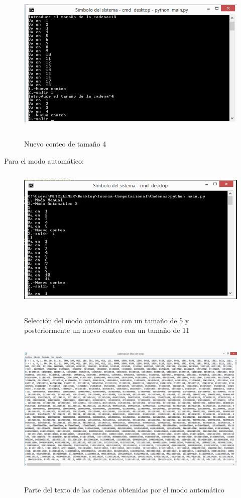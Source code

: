 \documentclass[12pt,letterpaper]{article}
\begin{document}
\begin{figure}[H]
\includegraphics[width=\textwidth, height=7cm]{nuevoconteo.png}
\label{fig:manualnuevoconteo_alfabeto}
\caption{Nuevo conteo de tama\~no 4}
\end{figure}

Para el modo autom\'atico:\\
\begin{figure}[H]
\includegraphics[width=\textwidth, height=7cm]{modoautomatico.png}
\label{fig:auto_alfabeto}
\caption{Selecci\'on del modo autom\'atico con un tama\~no de 5 y posteriormente un nuevo conteo con un tama\~no de 11}
\end{figure}

\begin{figure}[H]
\includegraphics[width=\textwidth, height=7cm]{textoautomatico.png}
\label{fig:autotexto_alfabeto}
\caption{Parte del texto de las cadenas obtenidas por el modo autom\'atico}
\end{figure}
\newpage
\end{document}
